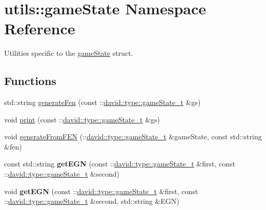 \hypertarget{namespaceutils_1_1gameState}{}\section{utils\+:\+:game\+State Namespace Reference}
\label{namespaceutils_1_1gameState}


Utilities specific to the \hyperlink{namespaceutils_1_1gameState}{game\+State} struct.  


\subsection*{Functions}
\begin{DoxyCompactItemize}
\item 
std\+::string \hyperlink{namespaceutils_1_1gameState_ab2faf98175ee89f29a5849378d7f3443}{generate\+Fen} (const \+::\hyperlink{structdavid_1_1bitboard_1_1gameState}{david\+::type\+::game\+State\+\_\+t} \&gs)
\item 
void \hyperlink{namespaceutils_1_1gameState_a0aeff39528e25bba3e73b05afe5ba786}{print} (const \+::\hyperlink{structdavid_1_1bitboard_1_1gameState}{david\+::type\+::game\+State\+\_\+t} \&gs)
\item 
void \hyperlink{namespaceutils_1_1gameState_a049c7f47b9e2cdee5cb549dbc7e02ea7}{generate\+From\+F\+EN} (\+::\hyperlink{structdavid_1_1bitboard_1_1gameState}{david\+::type\+::game\+State\+\_\+t} \&game\+State, const std\+::string \&fen)
\item 
\mbox{\label{namespaceutils_1_1gameState_a17242c9c0cc97774c01a28dcc9e5567e}} 
const std\+::string {\bfseries get\+E\+GN} (const \+::\hyperlink{structdavid_1_1bitboard_1_1gameState}{david\+::type\+::game\+State\+\_\+t} \&first, const \+::\hyperlink{structdavid_1_1bitboard_1_1gameState}{david\+::type\+::game\+State\+\_\+t} \&second)
\item 
\mbox{\label{namespaceutils_1_1gameState_a01a37066c796da5086d453040dd852e3}} 
void {\bfseries get\+E\+GN} (const \+::\hyperlink{structdavid_1_1bitboard_1_1gameState}{david\+::type\+::game\+State\+\_\+t} \&first, const \+::\hyperlink{structdavid_1_1bitboard_1_1gameState}{david\+::type\+::game\+State\+\_\+t} \&second, std\+::string \&E\+GN)
\item 
\mbox{\label{namespaceutils_1_1gameState_a82a8cb75c824b4a641bc625972fccbfc}} 

\end{DoxyCompactItemize}
